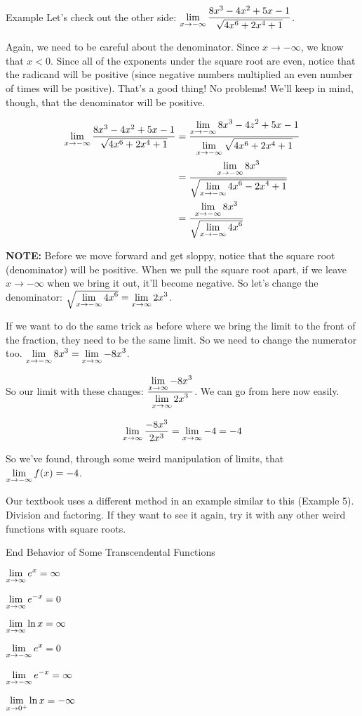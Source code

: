 \begin{note}{Example}
  Let's check out the other side: $\displaystyle \lim_{x\to-\infty} \frac{8x^3-4x^2+5x-1}{\sqrt{4x^6+2x^4+1}}$.

  Again, we need to be careful about the denominator.
  Since $x\to-\infty$, we know that $x<0$.
  Since all of the exponents under the square root are even, notice that the radicand will be positive (since negative numbers multiplied an even number of times will be positive).
  That's a good thing! No problems!
  We'll keep in mind, though, that the denominator will be positive.

  \begin{align*}
    \displaystyle \lim_{x\to-\infty} \frac{8x^3-4x^2+5x-1}{\sqrt{4x^6+2x^4+1}} &= \dfrac{\displaystyle \lim_{x\to-\infty}8x^3-4z^2+5x-1}{\displaystyle \lim_{x\to-\infty}\sqrt{4x^6+2x^4+1}}\\
    & = \dfrac{\displaystyle \lim_{x\to-\infty} 8x^3}{\sqrt{\displaystyle \lim_{x\to-\infty} 4x^6-2x^4+1}}\\
    & = \dfrac{\displaystyle \lim_{x\to-\infty} 8x^3}{\sqrt{\displaystyle \lim_{x\to-\infty}4x^6}}
  \end{align*}

  \textbf{NOTE:} Before we move forward and get sloppy, notice that the square root (denominator) will be positive.
  When we pull the square root apart, if we leave $x\to-\infty$ when we bring it out, it'll become negative.
  So let's change the denominator: $\sqrt{\displaystyle \lim_{x\to-\infty}4x^6} = \displaystyle \lim_{x\to\infty}2x^3$.

  If we want to do the same trick as before where we bring the limit to the front of the fraction, they need to be the same limit.
  So we need to change the numerator too. $\displaystyle \lim_{x\to-\infty} 8x^3 = \displaystyle \lim_{x\to\infty}-8x^3$.

  So our limit with these changes: $\dfrac{\displaystyle \lim_{x\to\infty}-8x^3}{\displaystyle \lim_{x\to\infty}2x^3}$.
  We can go from here now easily.

  \[\displaystyle \lim_{x\to\infty}\dfrac{-8x^3}{2x^3}=\displaystyle \lim_{x\to\infty}-4=-4\]

  So we've found, through some weird manipulation of limits, that $\displaystyle \lim_{x\to-\infty} f(x) = -4$.
\end{note}

Our textbook uses a different method in an example similar to this (Example 5).
Division and factoring.
If they want to see it again, try it with any other weird functions with square roots.

\begin{defn}{End Behavior of Some Transcendental Functions} \hspace{2cm}
  \begin{multicols}{2}
    $\displaystyle \lim_{x\to \infty} e^x = \infty$

    $\displaystyle \lim_{x\to \infty} e^{-x} = 0$

    $\displaystyle \lim_{x\to \infty} \ln x = \infty$

    $\displaystyle \lim_{x\to -\infty} e^x = 0$

    $\displaystyle \lim_{x\to -\infty} e^{-x} = \infty$

    $\displaystyle \lim_{x\to 0^+} \ln x = -\infty$
  \end{multicols}
\end{defn}

